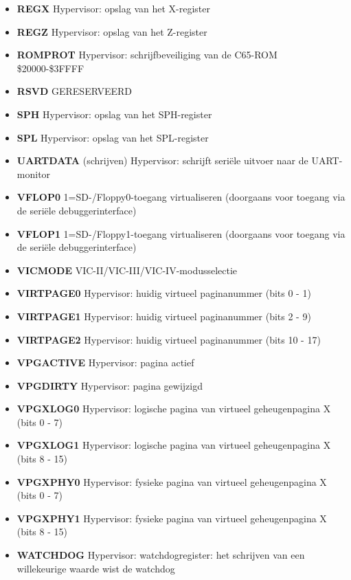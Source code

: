 \begin{itemize}
\item{\bf{REGX}} Hypervisor: opslag van het X-register
\item{\bf{REGZ}} Hypervisor: opslag van het Z-register
\item{\bf{ROMPROT}} Hypervisor: schrijfbeveiliging van de C65-ROM \$20000-\$3FFFF
\item{\bf{RSVD}} GERESERVEERD
\item{\bf{SPH}} Hypervisor: opslag van het SPH-register
\item{\bf{SPL}} Hypervisor: opslag van het SPL-register
\item{\bf{UARTDATA}} (schrijven) Hypervisor: schrijft seriële uitvoer naar de UART-monitor
\item{\bf{VFLOP0}} 1=SD-/Floppy0-toegang virtualiseren (doorgaans voor toegang via de seriële debuggerinterface)
\item{\bf{VFLOP1}} 1=SD-/Floppy1-toegang virtualiseren (doorgaans voor toegang via de seriële debuggerinterface)
\item{\bf{VICMODE}} VIC-II/VIC-III/VIC-IV-modusselectie
\item{\bf{VIRTPAGE0}} Hypervisor: huidig virtueel paginanummer (bits 0 - 1)
\item{\bf{VIRTPAGE1}} Hypervisor: huidig virtueel paginanummer (bits 2 - 9)
\item{\bf{VIRTPAGE2}} Hypervisor: huidig virtueel paginanummer (bits 10 - 17)
\item{\bf{VPGACTIVE}} Hypervisor: pagina actief
\item{\bf{VPGDIRTY}} Hypervisor: pagina gewijzigd
\item{\bf{VPGXLOG0}} Hypervisor: logische pagina van virtueel geheugenpagina X (bits 0 - 7)
\item{\bf{VPGXLOG1}} Hypervisor: logische pagina van virtueel geheugenpagina X (bits 8 - 15)
\item{\bf{VPGXPHY0}} Hypervisor: fysieke pagina van virtueel geheugenpagina X (bits 0 - 7)
\item{\bf{VPGXPHY1}} Hypervisor: fysieke pagina van virtueel geheugenpagina X (bits 8 - 15)
\item{\bf{WATCHDOG}} Hypervisor: watchdogregister: het schrijven van een willekeurige waarde wist de watchdog
\end{itemize}

